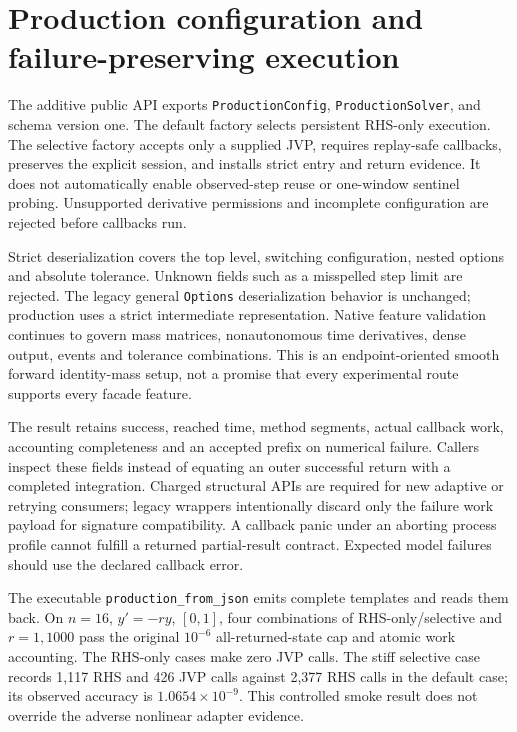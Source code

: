 \documentclass[aps,pra,reprint,onecolumn,12pt,notitlepage,superscriptaddress,nofootinbib]{revtex4-2}
\begin{document}
\section{Production configuration and failure-preserving execution}
The additive public API exports \texttt{ProductionConfig},
\texttt{ProductionSolver}, and schema version one. The default factory
selects persistent RHS-only execution. The selective factory accepts only
a supplied JVP, requires replay-safe callbacks, preserves the explicit
session, and installs strict entry and return evidence. It does not
automatically enable observed-step reuse or one-window sentinel probing.
Unsupported derivative permissions and incomplete configuration are
rejected before callbacks run.

Strict deserialization covers the top level, switching configuration,
nested options and absolute tolerance. Unknown fields such as a misspelled
step limit are rejected. The legacy general \texttt{Options}
deserialization behavior is unchanged; production uses a strict
intermediate representation. Native feature validation continues to govern
mass matrices, nonautonomous time derivatives, dense output, events and
tolerance combinations. This is an endpoint-oriented smooth forward
identity-mass setup, not a promise that every experimental route supports
every facade feature.

The result retains success, reached time, method segments, actual callback
work, accounting completeness and an accepted prefix on numerical failure.
Callers inspect these fields instead of equating an outer successful return
with a completed integration. Charged structural APIs are required for new
adaptive or retrying consumers; legacy wrappers intentionally discard only
the failure work payload for signature compatibility. A callback panic
under an aborting process profile cannot fulfill a returned partial-result
contract. Expected model failures should use the declared callback error.

The executable \texttt{production\_from\_json} emits complete templates and
reads them back. On $n=16$, $y'=-r y$, $[0,1]$, four combinations of
RHS-only/selective and $r=1,1000$ pass the original $10^{-6}$ all-returned-state
cap and atomic work accounting. The RHS-only cases make zero JVP calls.
The stiff selective case records 1,117 RHS and 426 JVP calls against 2,377
RHS calls in the default case; its observed accuracy is
$1.0654\times10^{-9}$. This controlled smoke result does not override the
adverse nonlinear adapter evidence.
\end{document}
